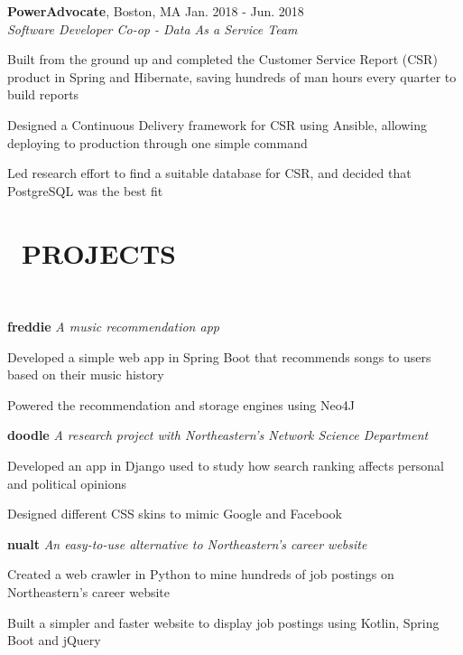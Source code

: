 \documentclass[11pt]{res}
\newcommand{\sectionunderline}{\vspace{-3mm}\hrulefill\\}
\newcommand{\newsect}[1]{\section{\Large \bf #1}}
\begin{document}
\begin{resume}
{{      {\bf PowerAdvocate}, Boston, MA \hfill Jan. 2018 - Jun. 2018\\
      {\it Software Developer Co-op - Data As a Service Team}
      \begin{itemize}
        {\item Built from the ground up and completed the Customer Service Report (CSR) product in Spring and Hibernate, saving hundreds of man hours every quarter to build reports}
        {\item Designed a Continuous Delivery framework for CSR using Ansible, allowing deploying to production through one simple command}
        {\item Led research effort to find a suitable database for CSR, and decided that PostgreSQL was the best fit}
      \end{itemize}
    }
  }

  \newsect{\faGithubAlt\ PROJECTS}{
    \sectionunderline{
      {\bf freddie} {\it A music recommendation app}
      \begin{itemize}
        {\item Developed a simple web app in Spring Boot that recommends songs to users based on their music history}
        {\item Powered the recommendation and storage engines using Neo4J}
      \end{itemize}

      {\bf doodle} {\it A research project with Northeastern's Network Science Department}
      \begin{itemize}
        {\item Developed an app in Django used to study how search ranking affects personal and political opinions}
        {\item Designed different CSS skins to mimic Google and Facebook}
      \end{itemize}

      {\bf nualt} {\it An easy-to-use alternative to Northeastern's career website}
      \begin{itemize}
        {\item Created a web crawler in Python to mine hundreds of job postings on Northeastern's career website}
        {\item Built a simpler and faster website to display job postings using Kotlin, Spring Boot and jQuery}
      \end{itemize}
    }
  }
\end{resume}
\end{document}
